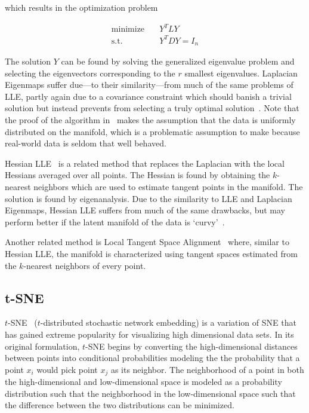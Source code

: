 which results in the optimization problem

\begin{align}
    \text{minimize} \quad & Y^TLY \\
    \text{s.t.} \quad & Y^TDY = I_n
\end{align}

The solution $Y$ can be found by solving the generalized eigenvalue problem and
selecting the eigenvectors corresponding to the $r$ smallest eigenvalues.
Laplacian Eigenmaps suffer due---to their similarity---from much of the same
problems of LLE, partly again due to a covariance constraint which should
banish a trivial solution but instead prevents from selecting a truly optimal
solution~\cite{vandermaaten_review}. Note that the proof of the algorithm
in~\cite{leigs} makes the assumption that the data is uniformly distributed on
the manifold, which is a problematic assumption to make because real-world data
is seldom that well behaved.

Hessian LLE~\cite{hlle} is a related method that replaces the Laplacian with
the local Hessians averaged over all points. The Hessian is found by obtaining
the $k$-nearest neighbors which are used to estimate tangent points in the manifold.
The solution is found by eigenanalysis. Due to the similarity to LLE and Laplacian Eigenmaps,
Hessian LLE suffers from much of the same drawbacks, but may perform better if the
latent manifold of the data is `curvy'~\cite{vandermaaten_review}.

Another related method is Local Tangent Space Alignment~\cite{ltsa} where, similar to
Hessian LLE, the manifold is characterized using tangent spaces estimated from the $k$-nearest
neighbors of every point.

\subsection{t-SNE}

$t$-SNE~\cite{tsne} ($t$-distributed stochastic network embedding) is a
variation of SNE that has gained extreme popularity for visualizing high
dimensional data sets. In its original formulation, $t$-SNE begins by
converting the high-dimensional distances between points into conditional
probabilities modeling the the probability that a point $x_i$ would pick point
$x_j$ as its neighbor. The neighborhood of a point in both the high-dimensional
and low-dimensional space is modeled as a probability distribution such that
the neighborhood in the low-dimensional space such that the difference between
the two distributions can be minimized.

